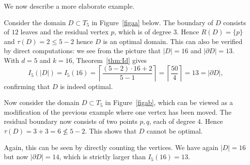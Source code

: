 \documentclass[a4paper, 11pt]{article}
\numberwithin{equation}{section}
\theoremstyle{definition}
\theoremstyle{remark}
\begin{document}
\bigskip 

We now describe a more elaborate example. 

\medskip

Consider the domain $D \subset T_5$  in Figure~\ref{figaa} below. The boundary of $D$ consists of   $12$ leaves and the residual vertex $p$, which is of degree $3$. Hence $R(D) = \{p\}$ and $\tau(D) = 2 \leq 5-2$ hence  $D$ is an optimal domain.
This can also be verified by direct computations: we see from the picture that  $|D| = 16$ and $|\partial D| = 13$. With $d=5$ and $k=16$, Theorem~\ref{thm:Id} gives
\[
   I_5(|D|) = I_5(16) = \left\lceil \frac{(5-2)\cdot 16 + 2}{5-1} \right\rceil
   = \left\lceil \frac{50}{4} \right\rceil
   = 13 = |\partial D|, 
\]
confirming  that $D$ is indeed optimal.

\medskip

Now consider the domain $D \subset T_5$ in Figure~\ref{figab}, which can be viewed as a modification of the previous example where one vertex has been moved. The residual boundary now consists of two points $p,q$, each of degree $4$.
Hence $\tau(D) = 3+3 = 6 \not\leq 5-2$.  This shows that $D$ cannot be optimal.

Again, this can be seen by directly counting the vertices. We have again $|D| = 16$ but now  $|\partial D| = 14$,
which is strictly larger than $I_5(16) = 13$. 

\medskip
\end{document}
